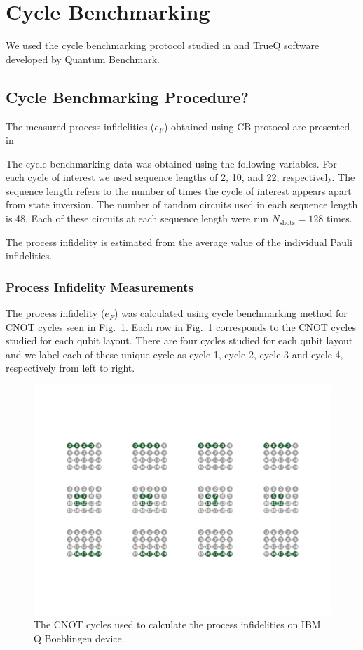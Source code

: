 
\section{Cycle Benchmarking}
\label{sec:cb}
We used the cycle benchmarking protocol studied in \cite{Erhard2019} and TrueQ software developed by Quantum Benchmark.



\subsection{Cycle Benchmarking Procedure?}
The measured process infidelities ($e_F$) obtained using CB protocol are presented in 


The cycle benchmarking data was obtained using the following variables. For each cycle of interest we used sequence lengths of 2, 10, and 22, respectively. The sequence length refers to the number of times the cycle of interest appears apart from state inversion. The number of random circuits used in each sequence length is 48. Each of these circuits at each sequence length were run $N_\text{shots}=128$ times. 

The process infidelity is estimated from the average value of the individual Pauli infidelities.


\subsubsection{Process Infidelity Measurements}
The process infidelity ($e_{F}$) was calculated using cycle benchmarking method for CNOT cycles seen in Fig.~\ref{fig:BoeblingenCycles}. Each row in Fig.~\ref{fig:BoeblingenCycles} corresponds to the CNOT cycles  studied for each qubit layout. There are four cycles studied for each qubit layout and we label each of these unique cycle as cycle 1, cycle 2, cycle 3 and cycle 4, respectively from left to right.
\begin{figure}[ht!]
    \includegraphics[scale=0.4]{BoeblingenCycles.pdf}
    \caption{The CNOT cycles used to calculate the process infidelities on IBM Q Boeblingen device.}
    \label{fig:BoeblingenCycles}
\end{figure}






